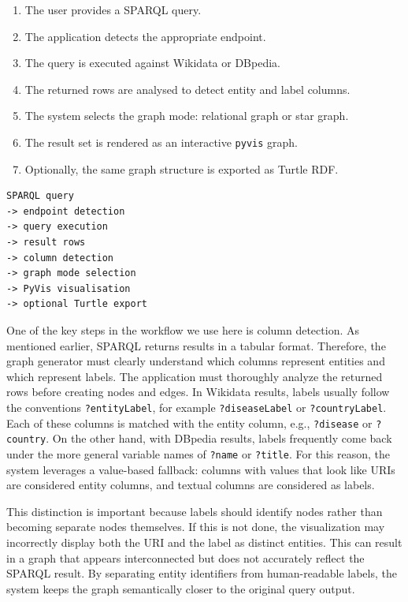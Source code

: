 \documentclass[11pt,a4paper]{article}
\begin{document}
\begin{enumerate}
    \item The user provides a SPARQL query.
    \item The application detects the appropriate endpoint.
    \item The query is executed against Wikidata or DBpedia.
    \item The returned rows are analysed to detect entity and label columns.
    \item The system selects the graph mode: relational graph or star graph.
    \item The result set is rendered as an interactive \texttt{pyvis} graph.
    \item Optionally, the same graph structure is exported as Turtle RDF.
\end{enumerate}

\begin{lstlisting}[style=plainStyle, caption={Pipeline for transforming SPARQL results into a graph representation.}, label={lst:kg-pipeline}]
SPARQL query
-> endpoint detection
-> query execution
-> result rows
-> column detection
-> graph mode selection
-> PyVis visualisation
-> optional Turtle export
\end{lstlisting}

One of the key steps in the workflow we use here is column detection. As mentioned earlier, SPARQL returns results in a tabular format. Therefore, the graph generator must clearly understand which columns represent entities and which represent labels. The application must thoroughly analyze the returned rows before creating nodes and edges. In Wikidata results, labels usually follow the conventions \texttt{?entityLabel}, for example \texttt{?diseaseLabel} or \texttt{?countryLabel}. Each of these columns is matched with the entity column, e.g., \texttt{?disease} or \texttt{?country}. On the other hand, with DBpedia results, labels frequently come back under the more general variable names of \texttt{?name} or \texttt{?title}. For this reason, the system leverages a value-based fallback: columns with values that look like URIs are considered entity columns, and textual columns are considered as labels.

This distinction is important because labels should identify nodes rather than becoming separate nodes themselves. If this is not done, the visualization may incorrectly display both the URI and the label as distinct entities. This can result in a graph that appears interconnected but does not accurately reflect the SPARQL result. By separating entity identifiers from human-readable labels, the system keeps the graph semantically closer to the original query output.
\end{document}
